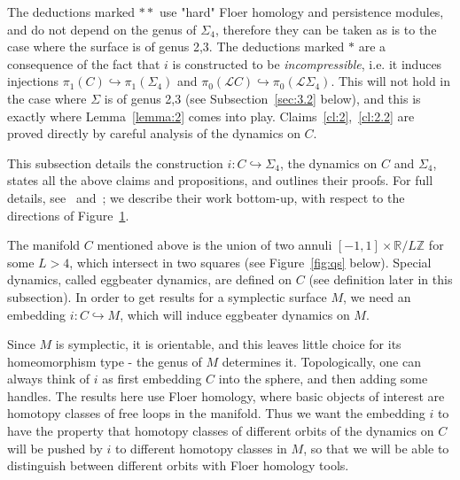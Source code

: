 \documentclass[11pt]{article}
\newcommand{\R}{\mathbb{R}}
\newcommand{\Z}{\mathbb{Z}}
\begin{document}
            The deductions marked $**$ use "hard" Floer homology and persistence modules, and do not depend on the genus of $\Sigma_4$, therefore they can be taken as is to the case where the surface is of genus 2,3. The deductions marked $*$ are a consequence of the fact that $i$ is constructed to be \textit{incompressible}, i.e. it induces injections $\pi_1(C) \hookrightarrow \pi_1(\Sigma_4)$ and $\pi_0(\mathscr{L}C) \hookrightarrow \pi_0(\mathscr{L}\Sigma_4)$. This will not hold in the case where $\Sigma$ is of genus 2,3 (see Subsection~\ref{sec:3.2} below), and this is exactly where Lemma~\ref{lemma:2} comes into play. Claims~\ref{cl:2},~\ref{cl:2.2} are proved directly by careful analysis of the dynamics on $C$.
            
            This subsection details the construction $i: C \hookrightarrow \Sigma_4$, the dynamics on $C$ and $\Sigma_4$, states all the above claims and propositions, and outlines their proofs. For full details, see~\cite{PS14} and~\cite{10}; we describe their work bottom-up, with respect to the directions of Figure~\ref{fig:orig_depends}. \\
            
            \begin{figure}[omitted: a diagram of this paper's results, not reproduced here]\label{fig:orig_depends}\end{figure}
            
            The manifold $C$ mentioned above is the union of two annuli $[-1,1] \times \R/L\Z$ for some $L>4$, which intersect in two squares (see Figure~\ref{fig:qs} below). Special dynamics, called eggbeater dynamics, are defined on $C$ (see definition later in this subsection). In order to get results for a symplectic surface $M$, we need an embedding $i: C \hookrightarrow M$, which will induce eggbeater dynamics on $M$.
            
            Since $M$ is symplectic, it is orientable, and this leaves little choice for its homeomorphism type - the genus of $M$ determines it. Topologically, one can always think of $i$ as first embedding $C$ into the sphere, and then adding some handles. The results here use Floer homology, where basic objects of interest are homotopy classes of free loops in the manifold. Thus we want the embedding $i$ to have the property that homotopy classes of different orbits of the dynamics on $C$ will be pushed by $i$ to different homotopy classes in $M$, so that we will be able to distinguish between different orbits with Floer homology tools.
            
\end{document}
